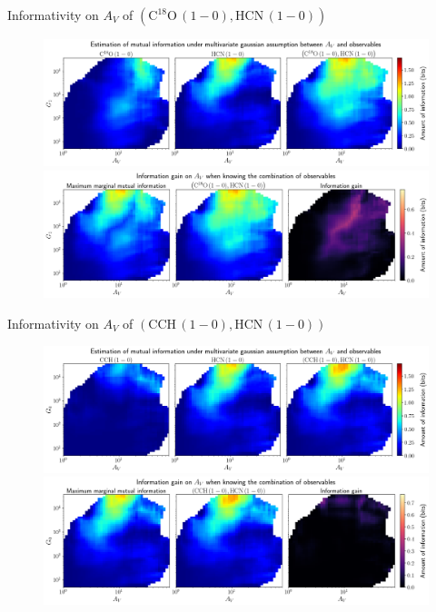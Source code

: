\documentclass{beamer}
\begin{document}
\begin{frame}{Informativity on $A_V$ of $\left(\mathrm{C^{18}O\,(1-0)},\mathrm{HCN\,(1-0)}\right)$}
    \begin{figure}
        \centering
        \includegraphics[width=0.95\linewidth]{../linearinfogauss/av__c18o10_hcn10_linearinfogauss.png}
        \vfill
        \includegraphics[width=0.95\linewidth]{../linearinfogauss/av__c18o10_hcn10_linearinfogauss_gain.png}
    \end{figure}
\end{frame}

\begin{frame}{Informativity on $A_V$ of $\left(\mathrm{CCH\,(1-0)},\mathrm{HCN\,(1-0)}\right)$}
    \begin{figure}
        \centering
        \includegraphics[width=0.95\linewidth]{../linearinfogauss/av__cch10_hcn10_linearinfogauss.png}
        \vfill
        \includegraphics[width=0.95\linewidth]{../linearinfogauss/av__cch10_hcn10_linearinfogauss_gain.png}
    \end{figure}
\end{frame}
\end{document}
